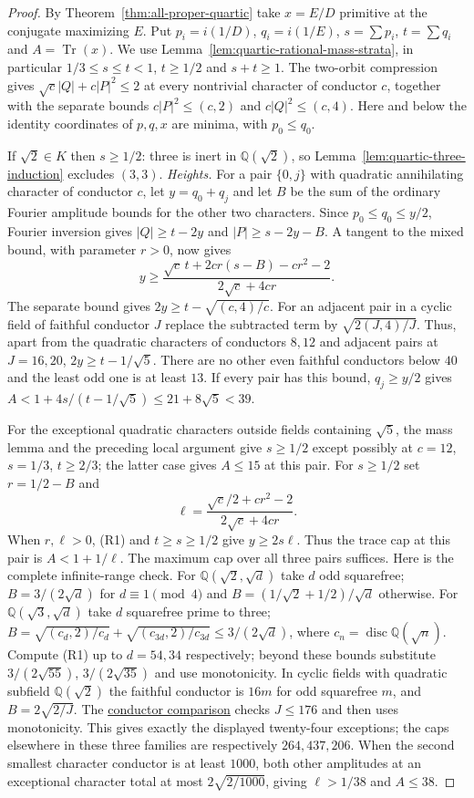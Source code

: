 \documentclass[11pt,reqno]{amsart}
\newcommand{\codecheck}[2]{\href{https://github.com/sebastienpalcoux/grothendieck-ring-classification/blob/d5750105bb5758f3ad38d2e5464dfcc12c019816/supplements/rank6/sphericality/#1}{#2}}
\theoremstyle{remark}\newtheorem{remark}[theorem]{Remark}
\numberwithin{equation}{section}
\begin{document}
\begin{proof}
By Theorem~\ref{thm:all-proper-quartic} take $x=E/D$ primitive at
the conjugate maximizing $E$. Put $p_i=i(1/D)$, $q_i=i(1/E)$,
$s=\sum p_i$, $t=\sum q_i$ and $A=\operatorname{Tr}(x)$. We use
Lemma~\ref{lem:quartic-rational-mass-strata}, in particular
$1/3\le s\le t<1$, $t\ge1/2$ and $s+t\ge1$. The two-orbit
compression gives $\sqrt c|Q|+c|P|^2\le2$ at every nontrivial
character of conductor $c$, together with the separate bounds
$c|P|^2\le(c,2)$ and $c|Q|^2\le(c,4)$. Here and below the
identity coordinates of $p,q,x$ are minima, with $p_0\le q_0$.

If $\sqrt2\in K$ then $s\ge1/2$: three is inert in $\mathbb Q(\sqrt2)$,
so Lemma~\ref{lem:quartic-three-induction} excludes $(3,3)$.
\smallskip\noindent\emph{Heights.}
For a pair $\{0,j\}$ with quadratic annihilating character of
conductor $c$, let $y=q_0+q_j$ and let $B$ be the sum of the
ordinary Fourier amplitude bounds for the other two characters.
Since $p_0\le q_0\le y/2$, Fourier inversion gives
$|Q|\ge t-2y$ and $|P|\ge s-2y-B$. A tangent to the mixed bound,
with parameter $r>0$, now gives
\[
 y\ge\frac{\sqrt c\,t+2cr(s-B)-cr^2-2}{2\sqrt c+4cr}.
\tag{R1}
\]
The separate bound gives $2y\ge t-\sqrt{(c,4)/c}$. For an adjacent
pair in a cyclic field of faithful conductor $J$ replace the
subtracted term by $\sqrt{2(J,4)/J}$. Thus, apart from the quadratic
characters of conductors $8,12$ and adjacent pairs at $J=16,20$,
$2y\ge t-1/\sqrt5$. There are no other even faithful conductors
below $40$ and the least odd one is at least $13$. If every pair has
this bound, $q_j\ge y/2$ gives
$A<1+4s/(t-1/\sqrt5)\le21+8\sqrt5<39$.

For the exceptional quadratic characters outside fields containing
$\sqrt5$, the mass lemma and the preceding local argument give
$s\ge1/2$ except possibly at $c=12$, $s=1/3$, $t\ge2/3$; the latter
case gives $A\le15$ at this pair. For $s\ge1/2$ set $r=1/2-B$
and
\[
 \ell=\frac{\sqrt c/2+cr^2-2}{2\sqrt c+4cr}.
\]
When $r,\ell>0$, (R1) and $t\ge s\ge1/2$ give $y\ge2s\ell$.
Thus the trace cap at this pair is $A<1+1/\ell$. The maximum cap
over all three pairs suffices. Here is the complete infinite-range
check. For $\mathbb Q(\sqrt2,\sqrt d)$ take $d$ odd squarefree;
$B=3/(2\sqrt d)$ for $d\equiv1\pmod4$ and
$B=(1/\sqrt2+1/2)/\sqrt d$ otherwise. For
$\mathbb Q(\sqrt3,\sqrt d)$ take $d$ squarefree prime to three;
$B=\sqrt{(c_d,2)/c_d}+\sqrt{(c_{3d},2)/c_{3d}}\le3/(2\sqrt d)$,
where $c_n=\operatorname{disc}\mathbb Q(\sqrt n)$. Compute (R1)
up to $d=54,34$ respectively; beyond these bounds substitute
$3/(2\sqrt{55})$, $3/(2\sqrt{35})$ and use monotonicity. In cyclic
fields with quadratic subfield $\mathbb Q(\sqrt2)$ the faithful
conductor is $16m$ for odd squarefree $m$, and $B=2\sqrt{2/J}$.
The \codecheck{quartic_rational_frontier/higher_degree_quartic_bounds.py}{conductor comparison} checks $J\le176$ and then uses monotonicity. This gives
exactly the displayed twenty-four exceptions; the caps elsewhere in
these three families are respectively $264,437,206$. When the second
smallest character conductor is at least $1000$, both other amplitudes
at an exceptional character total at most $2\sqrt{2/1000}$, giving
$\ell>1/38$ and $A\le38$.


\end{proof}
\end{document}

